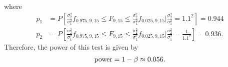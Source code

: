where
\begin{align*}
p_1 & = P\left[\frac{\sigma_2^2}{\sigma_1^2} f_{0.975,9,15} \leq F_{9,15} \leq \frac{\sigma_2^2}{\sigma_1^2} f_{0.025,9,15} \big| \frac{\sigma_2^2}{\sigma_1^2} = 1.1^2 \right] = 0.944 \\
p_2 & = P\left[\frac{\sigma_2^2}{\sigma_1^2} f_{0.975,9,15} \leq F_{9,15} \leq \frac{\sigma_2^2}{\sigma_1^2} f_{0.025,9,15} \big| \frac{\sigma_2^2}{\sigma_1^2} = \frac{1}{1.1^2} \right] = 0.936.
\end{align*}
Therefore, the power of this test is given by
\begin{align*}
\mathrm{power} = 1 - \beta \approx 0.056.
\end{align*}



